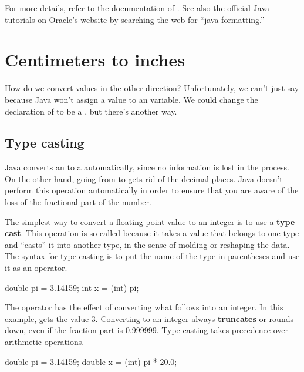 For more details, refer to the documentation of .
See also the official Java tutorials on Oracle's website by searching the web for ``java formatting.''


\section{Centimeters to inches}
\label{sec:rounding}

How do we convert values in the other direction?
Unfortunately, we can't just say  because Java won't assign a  value to an  variable.
We could change the declaration of  to be a , but there's another way.

\subsection{Type casting}

Java converts an  to a  automatically, since no information is lost in the process.
On the other hand, going from  to  gets rid of the decimal places.
Java doesn't perform this operation automatically in order to ensure that you are aware of the loss of the fractional part of the number.


The simplest way to convert a floating-point value to an integer is to use a {\bf type cast}.
This operation is so called because it takes a value that belongs to one type and ``casts'' it into another type, in the sense of molding or reshaping the data.
The syntax for type casting is to put the name of the type in parentheses and use it as an operator.

\begin{code}
    double pi = 3.14159;
    int x = (int) pi;
\end{code}


The  operator has the effect of converting what follows into an integer.
In this example,  gets the value 3.
Converting to an integer always {\bf truncates} or rounds down, even if the fraction part is 0.999999.
Type casting takes precedence over arithmetic operations.

\begin{code}
    double pi = 3.14159;
    double x = (int) pi * 20.0;
\end{code}

